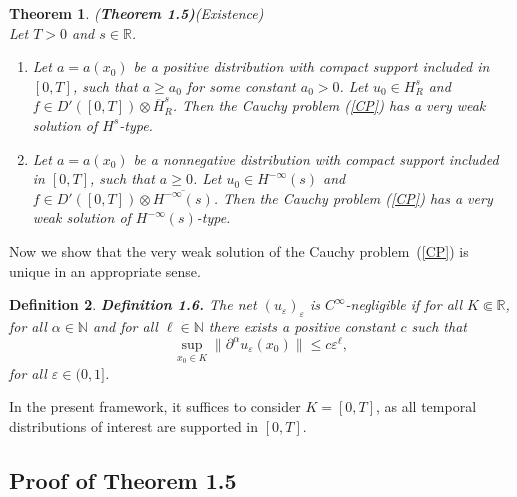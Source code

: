 \documentclass[12pt]{amsart}
\newtheorem{theorem}{Theorem}[section]
\newtheorem{definition}[theorem]{Definition}
\theoremstyle{definition}
\begin{document}
\begin{theorem}{(\bf Theorem 1.5)}(Existence)
\label{th1.5}\\
Let $T > 0$ and $s \in \mathbb{R}$.
\begin{enumerate}
    \item[(i)] Let $a = a(x_0)$ be a positive distribution with compact support included in $[0, T]$, such that $a \geq a_0$ for some constant $a_0 > 0$. Let $u_0 \in H_R^s$ and $f \in D'([0, T]) \otimes \overline{H}_R^s$. Then the Cauchy problem (\ref{CP}) has a very weak solution of $H^s$-type.
    
    \item[(ii)] Let $a = a(x_0)$ be a nonnegative distribution with compact support included in $[0, T]$, such that $a \geq 0$. Let $u_0\in H^{-\infty}(s)$ and $f \in D'([0, T]) \otimes \overline{H^{-\infty}(s)}$. Then the Cauchy problem (\ref{CP}) has a very weak solution of $H^{-\infty}(s)$-type.
\end{enumerate}
\end{theorem}

Now we show that the very weak solution of the Cauchy problem~(\ref{CP}) is unique in an appropriate sense.

\begin{definition}{\bf Definition 1.6.}
\label{def1.6}
The net $(u_\varepsilon)_\varepsilon$ is $C^\infty$-negligible if for all $K \Subset \mathbb{R}$, for all $\alpha \in \mathbb{N}$ and for all $\ell \in \mathbb{N}$ there exists a positive constant $c$ such that
\[
\sup_{x_0 \in K} \| \partial^\alpha u_\varepsilon(x_0) \| \leq c \varepsilon^\ell,
\]
for all $\varepsilon \in (0, 1]$.\\
\end{definition}
In the present framework, it suffices to consider $K = [0, T]$, as all temporal distributions of interest are supported in $[0, T]$.

\subsection*{Proof of Theorem 1.5}
\end{document}
